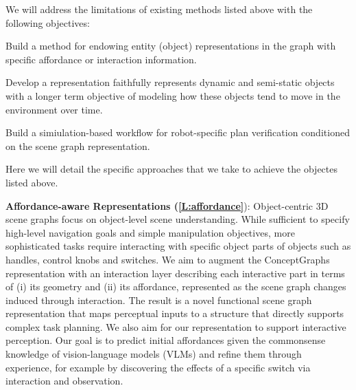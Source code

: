 \documentclass[english,
]{nserc-alliance}
\begin{document}
We will address the limitations of existing methods listed above with the following objectives:

\begin{enumerate} [label=\textbf{[O\arabic*]}]
    \item Build a method for endowing entity (object) representations in the graph with  specific affordance or interaction information.  \label{L:affordance}
    \item  Develop a  representation faithfully represents dynamic and semi-static objects with a longer term objective of modeling how these objects tend to move in the environment over time.   \label{L:time}
    \item Build a simiulation-based workflow for robot-specific plan verification conditioned on the scene graph representation.  \label{L:grounded}
    
\end{enumerate}


Here we will detail the specific approaches that we take to achieve the objectes listed above. 

\textbf{Affordance-aware Representations (\ref{L:affordance}}):
Object-centric 3D scene graphs focus on object-level scene understanding. While sufficient to specify high-level navigation goals and simple manipulation objectives, more sophisticated tasks require interacting with specific object parts of objects such as handles, control knobs and switches.
We aim to augment the ConceptGraphs \cite{concept-graphs} representation with an interaction layer describing each interactive part in terms of (i) its geometry and (ii) its affordance, represented as the scene graph changes induced through interaction.
The result is a novel functional scene graph representation that maps perceptual inputs to a structure that directly supports complex task planning.
We also aim for our representation to support interactive perception.
Our goal is to predict initial affordances given the commonsense knowledge of vision-language models (VLMs) and refine them through experience, for example by discovering the effects of a specific switch via interaction and observation.
\end{document}

